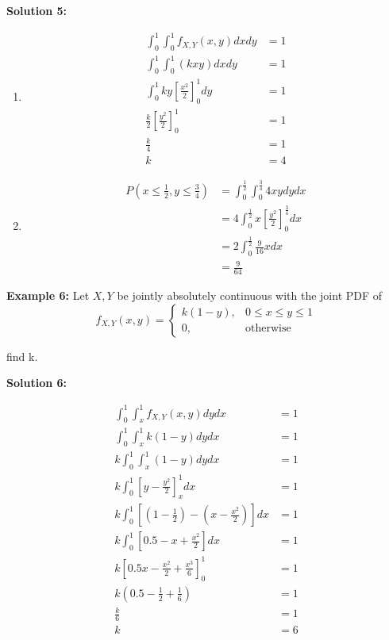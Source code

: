 \documentclass[12pt, twoside]{article}
\begin{document}
\textbf{Solution 5:}
\begin{enumerate}
	\item{
	\begin{align*}
		\int^1_0 \int^1_0 f_{X,Y}(x,y) dx dy &= 1\\
		\int^1_0 \int^1_0 (kxy) dx dy &= 1\\
		\int^1_0 ky[\frac{x^2}{2}]^1_0 dy &= 1\\
		\frac{k}{2} [\frac{y^2}{2}]^1_0 &= 1\\
		\frac{k}{4} &= 1\\
		k &= 4
	\end{align*}
	}
	\item{
	\begin{align*}
		P(x \leq \frac{1}{2}, y \leq \frac{3}{4}) &= \int_0^{\frac{1}{2}} \int_0^{\frac{3}{4}} 4xydydx\\
		&= 4 \int_0^{\frac{1}{2}} x[\frac{y^2}{2}]^{\frac{3}{4}}_0 dx\\
		&= 2 \int_0^{\frac{1}{2}} \frac{9}{16} x dx\\
		&=\frac{9}{64}
	\end{align*}
	}
\end{enumerate}

\textbf{Example 6:} Let $X,Y$ be jointly absolutely continuous with the joint PDF of $$f_{X,Y} (x,y) = \begin{cases}
	k(1-y), & 0 \leq x \leq y \leq 1\\
	0, & \text{otherwise}
\end{cases}
$$

find k.

\textbf{Solution 6:} 

\begin{align*}
	\int_0^1 \int_x^1 f_{X,Y} (x,y) dy dx &= 1\\
	\int_0^1 \int_x^1 k(1-y) dy dx &= 1\\
	k\int_0^1 \int_x^1 (1-y) dy dx &= 1\\
	k\int_0^1 [y - \frac{y^2}{2}]^1_x dx &= 1\\
	k\int_0^1 [(1-\frac{1}{2}) - (x - \frac{x^2}{2})] dx &= 1\\
	k\int_0^1 [0.5 - x + \frac{x^2}{2}] dx &= 1\\
	k[0.5x - \frac{x^2}{2} + \frac{x^3}{6}]^1_0 &= 1\\
	k(0.5 - \frac{1}{2} + \frac{1}{6}) &= 1\\
	\frac{k}{6} &= 1\\
	k &= 6
\end{align*}
\end{document}
